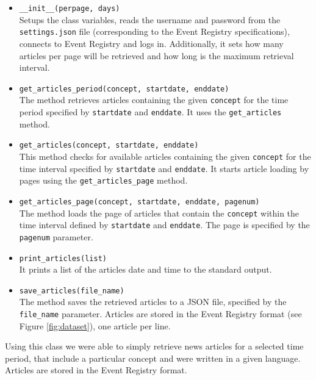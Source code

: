 \documentclass{acm_proc_article-sp}
\begin{document}
\begin{itemize}[leftmargin=0pt]
\item[] \texttt{\_\_init\_\_(perpage, days)} \\
Setups the class variables, reads the username and password from the \texttt{settings.json} file (corresponding to the Event Registry specifications), connects to Event Registry and logs in. Additionally, it sets how many articles per page will be retrieved and how long is the maximum retrieval interval.

\item[] \texttt{get\_articles\_period(concept, startdate, enddate)} \\
The method retrieves articles containing the given \texttt{concept} for the time period specified by \texttt{startdate} and \texttt{enddate}. It uses the \texttt{get\_articles} method.

\item[] \texttt{get\_articles(concept, startdate, enddate)} \\
This method checks for available articles containing the given \texttt{concept} for the time interval specified by \texttt{startdate} and \texttt{enddate}. It starts article loading by pages using the \texttt{get\_ar\-ti\-cles\_page} method.

\item[] \texttt{get\_articles\_page(concept, startdate, enddate, pagenum)} \\
The method loads the page of articles that contain the \texttt{concept} within the time interval defined by \texttt{startdate} and \texttt{enddate}. 
The page is specified by the \texttt{pagenum} parameter.

\item[] \texttt{print\_articles(list)} \\
It prints a list of the articles date and time to the standard output.

\item[] \texttt{save\_articles(file\_name)} \\
The method saves the retrieved articles to a JSON file, specified by the \texttt{file\_name} parameter. Articles are stored in the Event Registry format (see Figure \ref{fig:dataset}), one article per line.
\end{itemize}

Using this class we were able to simply retrieve news articles for a selected time period, that include a particular concept and were written in a given language. Articles are stored in the Event Registry format.
\end{document}
